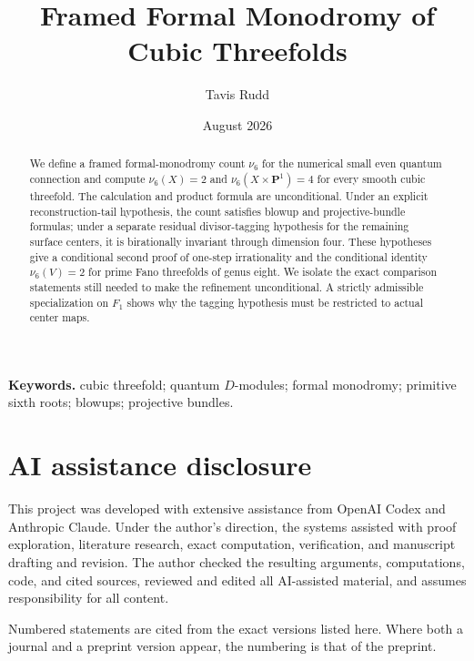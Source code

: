 \documentclass[11pt]{article}
\title{Framed Formal Monodromy of Cubic Threefolds}
\author{Tavis Rudd}
\date{August 2026}
\numberwithin{equation}{section}
\theoremstyle{definition}
\theoremstyle{remark}
\newcommand{\PP}{\mathbf P}
\begin{document}
\maketitle

\begin{abstract}
We define a framed formal-monodromy count \(\nu_6\) for the numerical small
even quantum connection and compute
\(\nu_6(X)=2\) and \(\nu_6(X\times\PP^1)=4\) for every smooth cubic
threefold.  The calculation and product formula are unconditional.  Under an
explicit reconstruction-tail hypothesis, the count satisfies blowup and
projective-bundle formulas; under a separate residual divisor-tagging
hypothesis for the remaining surface centers, it is birationally invariant
through dimension four.  These hypotheses give a conditional second proof
of one-step irrationality and the conditional identity \(\nu_6(V)=2\) for
prime Fano threefolds of genus eight.  We isolate the exact comparison
statements still needed to make the refinement unconditional. A strictly
admissible specialization on \(F_1\) shows why the tagging hypothesis
must be restricted to actual center maps.
\end{abstract}

\noindent\textbf{Keywords.} cubic threefold; quantum \(D\)-modules; formal
monodromy; primitive sixth roots; blowups; projective bundles.




\section*{AI assistance disclosure}

This project was developed with extensive assistance from OpenAI Codex and
Anthropic Claude. Under the author's direction, the systems assisted with
proof exploration, literature research, exact computation, verification,
and manuscript drafting and revision. The author checked the resulting
arguments, computations, code, and cited sources, reviewed and edited all
AI-assisted material, and assumes responsibility for all content.

\footnotesize
\noindent Numbered statements are cited from the exact versions listed here.
Where both a journal and a preprint version appear, the numbering is that of
the preprint.
\end{document}
